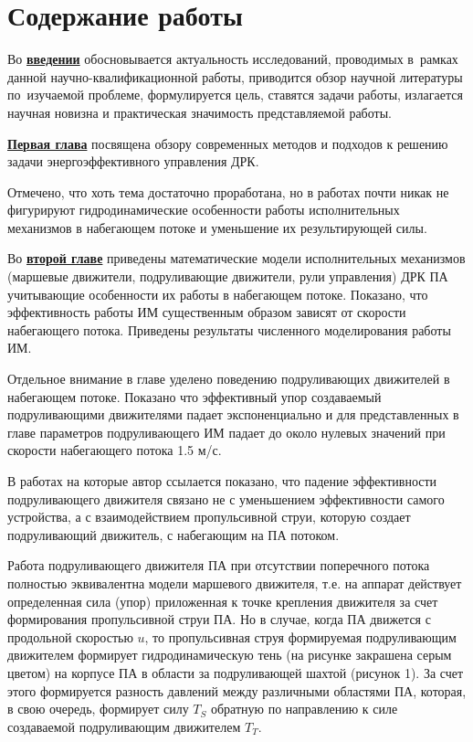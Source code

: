 

\section*{Содержание работы}

Во \underline{\textbf{введении}} обосновывается актуальность
исследований, проводимых в~рамках данной научно-квалификационной работы,
приводится обзор научной литературы по~изучаемой проблеме,
формулируется цель, ставятся задачи работы, излагается научная новизна
и практическая значимость представляемой работы.


\underline{\textbf{Первая глава}} посвящена обзору современных методов и подходов к решению задачи энергоэффективного управления ДРК.

Отмечено, что хоть тема достаточно проработана, но в работах почти никак не фигурируют гидродинамические особенности работы исполнительных механизмов в набегающем потоке и уменьшение их результирующей силы.

Во \underline{\textbf{второй главе}} приведены математические модели исполнительных механизмов (маршевые движители, подруливающие движители, рули управления) ДРК ПА учитывающие особенности их работы в набегающем потоке.
Показано, что эффективность работы ИМ существенным образом зависят от скорости набегающего потока. 
Приведены результаты численного моделирования работы ИМ.

Отдельное внимание в главе уделено поведению подруливающих движителей в набегающем потоке.
Показано что эффективный упор создаваемый подруливающими движителями падает экспоненциально и для представленных в главе параметров подруливающего ИМ падает до около нулевых значений при скорости набегающего потока 1.5 м/с.

В работах на которые автор ссылается показано, что падение эффективности подруливающего движителя связано не с уменьшением эффективности самого устройства, а с взаимодействием пропульсивной струи, которую создает подруливающий движитель, с набегающим на ПА потоком.

Работа подруливающего движителя ПА при отсутствии поперечного потока полностью эквивалентна модели маршевого движителя, т.е. на аппарат действует определенная сила (упор) приложенная к точке крепления движителя за счет формирования пропульсивной струи ПА.
Но в случае, когда ПА движется с продольной скоростью $u$, то пропульсивная струя формируемая подруливающим движителем формирует гидродинамическую тень (на рисунке закрашена серым цветом) на корпусе ПА в области за подруливающей шахтой (рисунок 1).
За счет этого формируется разность давлений между различными областями ПА, которая, в свою очередь, формирует силу $T_S$ обратную по направлению к силе создаваемой подруливающим движителем $T_T$.

